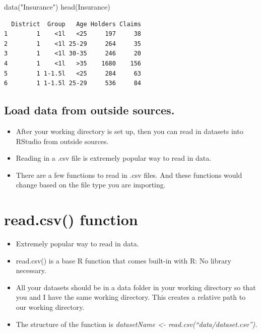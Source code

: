 \documentclass[
  letterpaper,
  DIV=11,
  numbers=noendperiod]{scrreprt}
\newenvironment{Shaded}{\begin{snugshade}}{\end{snugshade}}
\newcommand{\FunctionTok}[1]{\textcolor[rgb]{0.28,0.35,0.67}{#1}}
\newcommand{\NormalTok}[1]{\textcolor[rgb]{0.00,0.23,0.31}{#1}}
\newcommand{\StringTok}[1]{\textcolor[rgb]{0.13,0.47,0.30}{#1}}
\begin{document}
\begin{Shaded}
\begin{Highlighting}[]
\FunctionTok{data}\NormalTok{(}\StringTok{"Insurance"}\NormalTok{)}
\FunctionTok{head}\NormalTok{(Insurance)}
\end{Highlighting}
\end{Shaded}

\begin{verbatim}
  District  Group   Age Holders Claims
1        1    <1l   <25     197     38
2        1    <1l 25-29     264     35
3        1    <1l 30-35     246     20
4        1    <1l   >35    1680    156
5        1 1-1.5l   <25     284     63
6        1 1-1.5l 25-29     536     84
\end{verbatim}

\subsection{Load data from outside
sources.}\label{load-data-from-outside-sources.}

\begin{itemize}
\item
  After your working directory is set up, then you can read in datasets
  into RStudio from outside sources.
\item
  Reading in a .csv file is extremely popular way to read in data.
\item
  There are a few functions to read in .csv files. And these functions
  would change based on the file type you are importing.
\end{itemize}

\section{read.csv() function}\label{read.csv-function}

\begin{itemize}
\item
  Extremely popular way to read in data.
\item
  read.csv() is a base R function that comes built-in with R: No library
  necessary.
\item
  All your datasets should be in a data folder in your working directory
  so that you and I have the same working directory. This creates a
  relative path to our working directory.
\item
  The structure of the function is \emph{datasetName \textless-
  read.csv(``data/dataset.csv'').}
\end{itemize}
\end{document}

